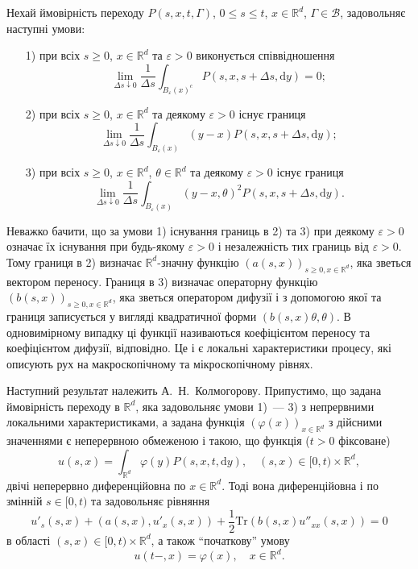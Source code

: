 \documentclass[11pt, reqno]{amsart}
\begin{document}
Нехай ймовірність переходу $P(s,x,t,\Gamma)$, $0\le s\le t$, $x\in\mathbb{R}^d$, $\Gamma\in\mathcal{B}$, задовольняє наступні умови:
\begin{enumerate}
	\item[1)] при всіх $s\geq0$, $x\in\mathbb{R}^d$ та $\varepsilon>0$ виконується співвідношення
	$$\lim_{\Delta s\downarrow 0}\frac{1}{\Delta s}\int_{B_{\varepsilon}(x)^{c}}P(s,x,s+\Delta s,\mathrm{d}y)=0;$$
	\item[2)] при всіх $s\geq0$, $x\in\mathbb{R}^d$ та деякому $\varepsilon>0$ існує границя
	$$\lim_{\Delta s\downarrow 0}\frac{1}{\Delta s}\int_{B_{\varepsilon}(x)}(y-x)P(s,x,s+\Delta s,\mathrm{d}y);$$
	\item[3)] при всіх $s\geq0$, $x\in\mathbb{R}^d$, $\theta\in\mathbb{R}^d$ та деякому $\varepsilon>0$ існує границя
	$$\lim_{\Delta s\downarrow 0}\frac{1}{\Delta s}\int_{B_{\varepsilon}(x)}(y-x,\theta)^{2}P(s,x,s+\Delta s,\mathrm{d}y).$$
\end{enumerate}

Неважко бачити, що за умови 1) існування границь в 2) та 3) при деякому $\varepsilon>0$ означає їх існування при будь-якому $\varepsilon>0$ і незалежність тих границь від $\varepsilon>0$. Тому границя в 2) визначає $\mathbb{R}^d$-значну функцію $(a(s,x))_{s\geq 0, x\in\mathbb{R}^d}$, яка зветься вектором переносу. Границя в 3) визначає операторну функцію $(b(s,x))_{s\geq 0, x\in\mathbb{R}^d}$, яка зветься оператором дифузії і з допомогою якої та границя записується у вигляді квадратичної форми $(b(s,x)\theta,\theta)$. В одновимірному випадку ці функції називаються коефіцієнтом переносу та коефіцієнтом дифузії, відповідно. Це і є локальні характеристики процесу, які описують рух на макроскопічному та мікроскопічному рівнях.

Наступний результат належить А.~Н.~Колмогорову. Припустимо, що задана ймовірність переходу в $\mathbb{R}^d$, яка задовольняє умови 1)~--- 3) з непрервними локальними характеристиками, а задана функція $(\varphi(x))_{x\in\mathbb{R}^d}$ з дійсними значеннями є неперервною обмеженою і такою, що функція ($t>0$ фіксоване)
\begin{equation}
\label{f1}
u(s,x)=\int_{\mathbb{R}^d}\varphi(y)P(s,x,t,\mathrm{d}y), \quad (s,x)\in[0,t)\times\mathbb{R}^d,
\end{equation}
двічі неперервно диференційовна по $x\in\mathbb{R}^d$.
Тоді вона диференційовна і по змінній $s\in[0,t)$ та задовольняє рівняння
\begin{equation}
\label{f2}
u'_s(s,x)+\left(a(s,x),u'_x(s,x)\right)+\frac{1}{2}\mathrm{Tr}\left(b(s,x)u''_{xx}(s,x)\right)=0
\end{equation}
в області $(s,x)\in[0,t)\times\mathbb{R}^d$, а також ``початкову'' умову
\begin{equation}
\label{f3}
u(t-,x)=\varphi(x),\quad x\in\mathbb{R}^d.
\end{equation}
\end{document}

